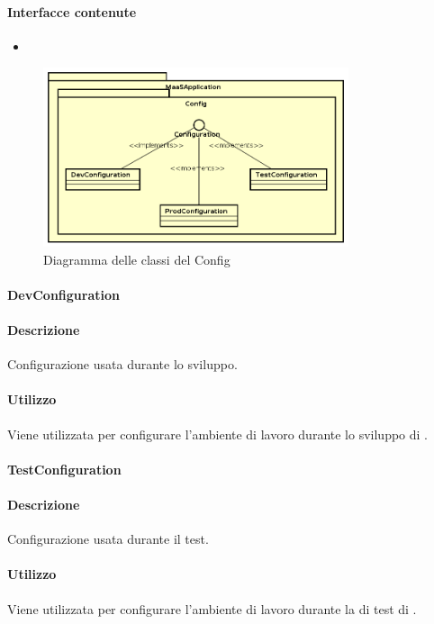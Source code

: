 \paragraph*{Interfacce contenute}
\begin{itemize}
\item {}
\end{itemize}

\begin{figure}[H]
\centering
\includegraphics[width=0.8\textwidth]{res/sections/backend/config.png}
\caption{Diagramma delle classi del  Config}
\end{figure}

\paragraph{DevConfiguration}
\paragraph*{Descrizione}
Configurazione usata durante lo sviluppo.

\paragraph*{Utilizzo}
Viene utilizzata per configurare l'ambiente di lavoro durante lo sviluppo di .

\paragraph{TestConfiguration}
\paragraph*{Descrizione}
Configurazione usata durante il test.

\paragraph*{Utilizzo}
Viene utilizzata per configurare l'ambiente di lavoro durante la  di test di .

